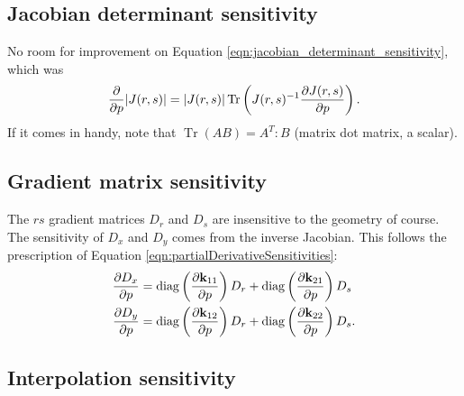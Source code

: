 \subsection{Jacobian determinant sensitivity}

No room for improvement on Equation \ref{eqn:jacobian_determinant_sensitivity}, which was
%
\begin{equation}
\frac{\partial{}}{\partial{p}} |J(r,s)| = |J(r,s)| \operatorname{Tr} \left( J(r,s)^{-1} \frac{\partial{J(r,s)}}{\partial{p}} \right).
\end{equation}
%
If it comes in handy, note that $\operatorname{Tr}(AB) = A^T : B$ (matrix dot matrix, a scalar).

\subsection{Gradient matrix sensitivity}

The $rs$ gradient matrices $D_r$ and $D_s$ are insensitive to the geometry of course.  The sensitivity of $D_x$ and $D_y$ comes from the inverse Jacobian.  This follows the prescription of Equation \ref{eqn:partialDerivativeSensitivities}:
%
\begin{equation}
\label{eqn:gradient_matrix_sensitivity}
\begin{aligned}
\frac{\partial{D_x}}{\partial{p}} &= \operatorname{diag} \left( \frac{\partial{\textbf{k}_{11}}}{\partial{p}} \right) D_r + \operatorname{diag} \left( \frac{\partial{\textbf{k}_{21}}}{\partial{p}} \right) D_s \\
\frac{\partial{D_y}}{\partial{p}} &= \operatorname{diag} \left( \frac{\partial{\textbf{k}_{12}}}{\partial{p}} \right) D_r + \operatorname{diag} \left( \frac{\partial{\textbf{k}_{22}}}{\partial{p}} \right) D_s. \\
\end{aligned}
\end{equation}

\subsection{Interpolation sensitivity}

